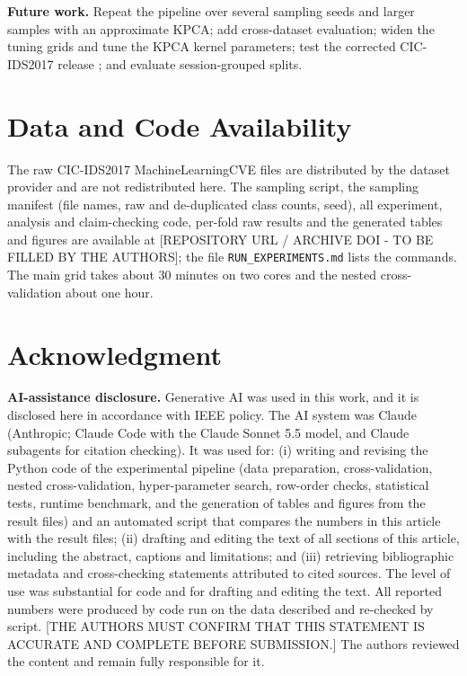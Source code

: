 \documentclass[conference,a4paper]{IEEEtran}
\begin{document}
\textbf{Future work.} Repeat the pipeline over several sampling seeds and larger samples with an approximate KPCA; add cross-dataset evaluation; widen the tuning grids and tune the KPCA kernel parameters; test the corrected CIC-IDS2017 release \cite{engelen2021}; and evaluate session-grouped splits.


\section*{Data and Code Availability}
The raw CIC-IDS2017 MachineLearningCVE files are distributed by the dataset provider \cite{sharafaldin2018} and are not redistributed here. The sampling script, the sampling manifest (file names, raw and de-duplicated class counts, seed), all experiment, analysis and claim-checking code, per-fold raw results and the generated tables and figures are available at [REPOSITORY URL / ARCHIVE DOI - TO BE FILLED BY THE AUTHORS]; the file \texttt{RUN\_EXPERIMENTS.md} lists the commands. The main grid takes about 30 minutes on two cores and the nested cross-validation about one hour.

\section*{Acknowledgment}
\textbf{AI-assistance disclosure.} Generative AI was used in this work, and it is disclosed here in accordance with IEEE policy. The AI system was Claude (Anthropic; Claude Code with the Claude Sonnet 5.5 model, and Claude subagents for citation checking). It was used for: (i) writing and revising the Python code of the experimental pipeline (data preparation, cross-validation, nested cross-validation, hyper-parameter search, row-order checks, statistical tests, runtime benchmark, and the generation of tables and figures from the result files) and an automated script that compares the numbers in this article with the result files; (ii) drafting and editing the text of all sections of this article, including the abstract, captions and limitations; and (iii) retrieving bibliographic metadata and cross-checking statements attributed to cited sources. The level of use was substantial for code and for drafting and editing the text. All reported numbers were produced by code run on the data described and re-checked by script. [THE AUTHORS MUST CONFIRM THAT THIS STATEMENT IS ACCURATE AND COMPLETE BEFORE SUBMISSION.] The authors reviewed the content and remain fully responsible for it.
\end{document}
